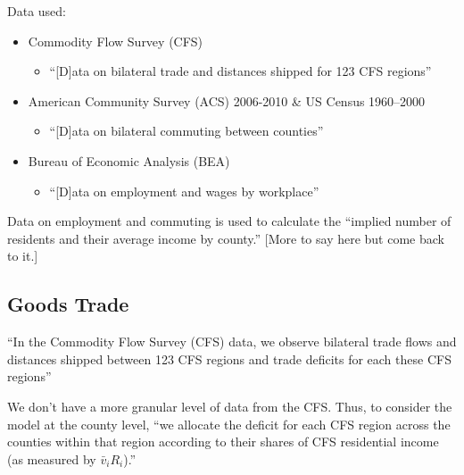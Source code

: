 \documentclass[10pt]{article}
\begin{document}
Data used:

\begin{itemize}
    \item Commodity Flow Survey (CFS)
        \begin{itemize}
            \item ``[D]ata on bilateral trade and distances shipped for 123 CFS regions''
        \end{itemize}
    \item American Community Survey (ACS) 2006-2010 \& US Census 1960–2000
        \begin{itemize}
            \item ``[D]ata on bilateral commuting between counties''
        \end{itemize}
    \item Bureau of Economic Analysis (BEA)
        \begin{itemize}
            \item ``[D]ata on employment and wages by workplace''
        \end{itemize}
\end{itemize}

Data on employment and commuting is used to calculate the 
``implied number of residents and their average income by county.''
[More to say here but come back to it.]


\subsection{Goods Trade}


``In the Commodity Flow Survey (CFS) data, 
we observe bilateral trade flows and
distances shipped between 123 CFS regions 
and trade deficits for each these CFS
regions''

We don't have a more granular level of data from 
the CFS. Thus, to consider the model at the county level,
``we allocate the deficit for each 
CFS region across the counties within that region according to their shares of CFS
residential income (as measured by $\bar{v}_i R_i$).''


\end{document}
